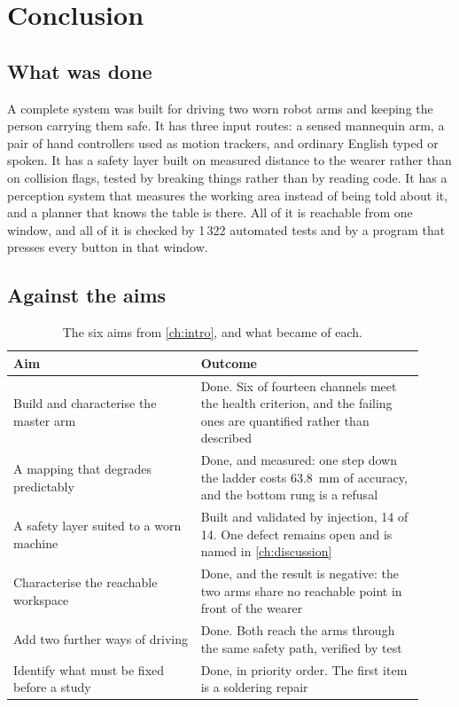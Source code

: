 \chapter{Conclusion}
\label{ch:conclusion}

\section{What was done}

A complete system was built for driving two worn robot arms and keeping the
person carrying them safe. It has three input routes: a sensed mannequin arm,
a pair of hand controllers used as motion trackers, and ordinary English typed
or spoken. It has a safety layer built on measured distance to the wearer
rather than on collision flags, tested by breaking things rather than by
reading code. It has a perception system that measures the working area
instead of being told about it, and a planner that knows the table is there.
All of it is reachable from one window, and all of it is checked by 1\,322
automated tests and by a program that presses every button in that window.

\section{Against the aims}

\begin{table}[htbp]
  \centering
  \small
  \caption[Aims and outcomes]{The six aims from \cref{ch:intro}, and what
  became of each.}
  \label{tab:aims}
  \begin{tabular}{@{}p{0.42\linewidth}p{0.50\linewidth}@{}}
    \toprule
    \textbf{Aim} & \textbf{Outcome} \\
    \midrule
    Build and characterise the master arm & Done. Six of fourteen channels
      meet the health criterion, and the failing ones are quantified rather
      than described \\
    A mapping that degrades predictably & Done, and measured: one step down
      the ladder costs \SI{63.8}{\milli\metre} of accuracy, and the bottom
      rung is a refusal \\
    A safety layer suited to a worn machine & Built and validated by
      injection, 14 of 14. One defect remains open and is named in
      \cref{ch:discussion} \\
    Characterise the reachable workspace & Done, and the result is negative:
      the two arms share no reachable point in front of the wearer \\
    Add two further ways of driving & Done. Both reach the arms through the
      same safety path, verified by test \\
    Identify what must be fixed before a study & Done, in priority order. The
      first item is a soldering repair \\
    \bottomrule
  \end{tabular}
\end{table}

